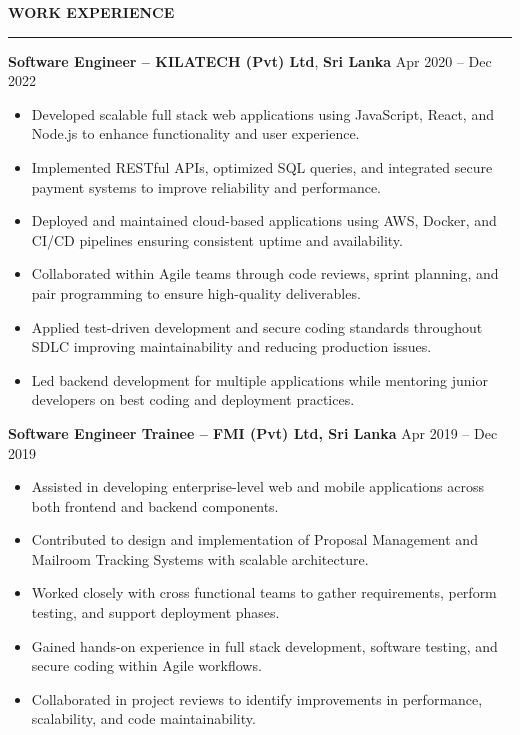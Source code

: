 \documentclass[10pt,letterpaper]{article}
\begin{document}
\vspace{8pt}

\textbf{WORK EXPERIENCE}\\[-8pt]
\noindent\rule{\textwidth}{1pt}

\vspace{-2pt}

\textbf{Software Engineer -- KILATECH (Pvt) Ltd}, \textbf{Sri Lanka} \hfill Apr 2020 -- Dec 2022

\vspace{-1pt}

\begin{itemize}
\item Developed scalable full stack web applications using JavaScript, React, and Node.js to enhance functionality and user experience.
\item Implemented RESTful APIs, optimized SQL queries, and integrated secure payment systems to improve reliability and performance.
\item Deployed and maintained cloud-based applications using AWS, Docker, and CI/CD pipelines ensuring consistent uptime and availability.
\item Collaborated within Agile teams through code reviews, sprint planning, and pair programming to ensure high-quality deliverables.
\item Applied test-driven development and secure coding standards throughout SDLC improving maintainability and reducing production issues.
\item Led backend development for multiple applications while mentoring junior developers on best coding and deployment practices.
\end{itemize}

\textbf{Software Engineer Trainee -- FMI (Pvt) Ltd, Sri Lanka} \hfill Apr 2019 -- Dec 2019

\vspace{-1pt}

\begin{itemize}
\item Assisted in developing enterprise-level web and mobile applications across both frontend and backend components.
\item Contributed to design and implementation of Proposal Management and Mailroom Tracking Systems with scalable architecture.
\item Worked closely with cross functional teams to gather requirements, perform testing, and support deployment phases.
\item Gained hands-on experience in full stack development, software testing, and secure coding within Agile workflows.
\item Collaborated in project reviews to identify improvements in performance, scalability, and code maintainability.
\end{itemize}
\end{document}
